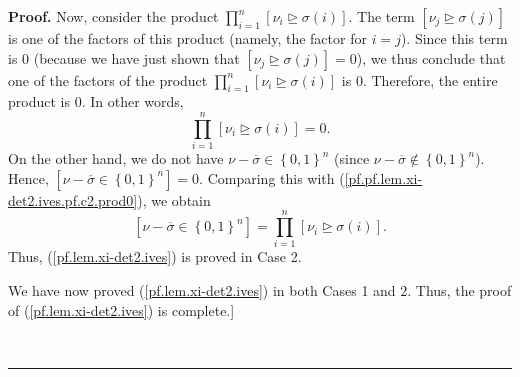 \documentclass[numbers=enddot,12pt,final,onecolumn,notitlepage,english]{scrartcl}%
\theoremstyle{definition}
\newenvironment{proof}[1][Proof]{\noindent\textbf{#1.} }{\ \rule{0.5em}{0.5em}}
\let\prodnonlimits\prod
\renewcommand{\prod}{\prodnonlimits\limits}
\newenvironment{verlong}{}{}
\begin{document}
\begin{verlong}
\begin{proof}
Now, consider the product $\prod_{i=1}^{n}\left[  \nu_{i}\trianglerighteq
\sigma\left(  i\right)  \right]  $. The term $\left[  \nu_{j}\trianglerighteq
\sigma\left(  j\right)  \right]  $ is one of the factors of this product
(namely, the factor for $i=j$). Since this term is $0$ (because we have just
shown that $\left[  \nu_{j}\trianglerighteq\sigma\left(  j\right)  \right]
=0$), we thus conclude that one of the factors of the product $\prod_{i=1}%
^{n}\left[  \nu_{i}\trianglerighteq\sigma\left(  i\right)  \right]  $ is $0$.
Therefore, the entire product is $0$. In other words,
\begin{equation}
\prod_{i=1}^{n}\left[  \nu_{i}\trianglerighteq\sigma\left(  i\right)  \right]
=0. \label{pf.pf.lem.xi-det2.ives.pf.c2.prod0}%
\end{equation}
On the other hand, we do not have $\nu-\overline{\sigma}\in\left\{
0,1\right\}  ^{n}$ (since $\nu-\overline{\sigma}\notin\left\{  0,1\right\}
^{n}$). Hence, $\left[  \nu-\overline{\sigma}\in\left\{  0,1\right\}
^{n}\right]  =0$. Comparing this with
(\ref{pf.pf.lem.xi-det2.ives.pf.c2.prod0}), we obtain%
\[
\left[  \nu-\overline{\sigma}\in\left\{  0,1\right\}  ^{n}\right]
=\prod_{i=1}^{n}\left[  \nu_{i}\trianglerighteq\sigma\left(  i\right)
\right]  .
\]
Thus, (\ref{pf.lem.xi-det2.ives}) is proved in Case 2. \medskip

We have now proved (\ref{pf.lem.xi-det2.ives}) in both Cases 1 and 2. Thus,
the proof of (\ref{pf.lem.xi-det2.ives}) is complete.] \medskip


\end{proof}
\end{verlong}
\end{document}
